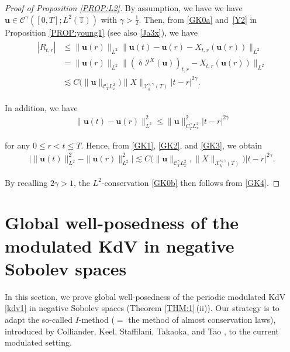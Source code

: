 \documentclass[letterpaper, 11pt,  reqno]{amsart}
\newcommand{\1}{\hspace{0.5mm}\text{I}\hspace{0.5mm}}
\newcommand{\I}{\mathcal{I}}
\newcommand{\noi}{\noindent}
\newcommand{\T}{\mathbb{T}}
\newcommand{\CC}{\mathcal{C}}
\newcommand{\updl}{\updelta}
\newcommand{\g}{\gamma}
\newcommand{\les}{\lesssim}
\newcommand{\cX}{\mathcal{X}}
\newcommand{\uu}{\mathbf{u}}
\numberwithin{equation}{section}
\numberwithin{theorem}{section}
\begin{document}
\begin{proof}[Proof of Proposition \ref{PROP:L2}]
\noi
By assumption, we have 
we have 
 $\uu\in \CC^\g([0, T];  L^2(\T))$
with $\g>\frac 12$. 
Then, 
from \eqref{GK0a} and~\eqref{Y2} in Proposition \ref{PROP:young1}
(see also \eqref{Ja3x}), 
we have 
\begin{align}
\begin{split}
|R_{t,r}| 
&\leq 
\|\uu(r)\|_{L^2}
\|\uu(t)- \uu(r) -X_{t,r}(\uu(r))\|_{L^2}
\\
&= 
\|\uu(r)\|_{L^2}
\|(\updl\I^X(\uu))_{t, r}  -X_{t,r}(\uu(r))\|_{L^2}
\\
&\les 
C\big(\|\uu\|_{\CC^\g_{T} L^2_x}\big)  \|X\|_{\cX^{s, \g}_k(T)} |t-r|^{2\g}.
\end{split}
\label{GK2}
\end{align}



\noi 
In addition, we have 
\begin{align}
\|\uu(t)-\uu(r)\|_{L^2}^2 
\leq 
\|\uu\|_{C^\g_T L^2_x}^2 
|t-r|^{2\g}
\label{GK3}
\end{align}

\noi
for any  $0\leq r<t\leq T$.
Hence, from \eqref{GK1}, \eqref{GK2}, and \eqref{GK3}, 
we obtain 
\begin{align}
\big| 
 \|  \uu(t)  \|^2_{L^2}- 
\| \uu(r)  \|^2_{L^2}
 \big|
 \lesssim
 C\big(\|\uu\|_{\CC^\g_{T} L^2_x},   \|X\|_{\cX^{s, \g}_k(T)}\big)
 |t-r |^{2\g}.
\label{GK4}
\end{align}

\noi
By recalling $2\g > 1$, 
the $L^2$-conservation \eqref{GK0b}
then follows from \eqref{GK4}.
\end{proof}

























\section{Global well-posedness of the modulated KdV in negative Sobolev spaces}
\label{SEC:I}

In this section, we prove global well-posedness of 
the periodic modulated KdV \eqref{kdv1}  in negative Sobolev spaces 
(Theorem \ref{THM:1}\,(ii)).
Our strategy is to adapt 
the so-called $I$-method ($=$ the method of almost conservation laws), 
introduced by Colliander, Keel, Staffilani, Takaoka, and Tao
\cite{CKSTT03}, to the current modulated setting.
\end{document}
